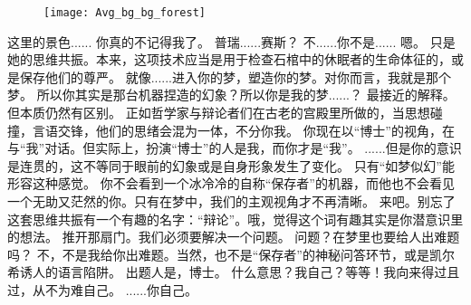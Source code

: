 \documentclass[openany]{book}
\begin{document}
\begin{figure}[h]
    \centering
    \texttt{[image: Avg\_bg\_bg\_forest]}
\end{figure}
\begin{dialogue}
     这里的景色......
     你真的不记得我了。
     普瑞......赛斯？
     不......你不是......
     嗯。
     只是她的思维共振。本来，这项技术应当是用于检查石棺中的休眠者的生命体征的，或是保存他们的尊严。
     就像......进入你的梦，塑造你的梦。对你而言，我就是那个梦。
     所以你其实是那台机器捏造的幻象？所以你是我的梦......？
     最接近的解释。但本质仍然有区别。
     正如哲学家与辩论者们在古老的宫殿里所做的，当思想碰撞，言语交锋，他们的思绪会混为一体，不分你我。
     你现在以“博士”的视角，在与“我”对话。但实际上，扮演“博士”的人是我，而你才是“我”。
     ......但是你的意识是连贯的，这不等同于眼前的幻象或是自身形象发生了变化。
     只有“如梦似幻”能形容这种感觉。
     你不会看到一个冰冷冷的自称“保存者”的机器，而他也不会看见一个无助又茫然的你。只有在梦中，我们的主观视角才不再清晰。
     来吧。别忘了这套思维共振有一个有趣的名字：“辩论”。哦，觉得这个词有趣其实是你潜意识里的想法。
     推开那扇门。我们必须要解决一个问题。
     问题？在梦里也要给人出难题吗？
     不，不是我给你出难题。当然，也不是“保存者”的神秘问答环节，或是凯尔希诱人的语言陷阱。
     出题人是，博士。
     什么意思？我自己？等等！我向来得过且过，从不为难自己。
     ......你自己。
\end{dialogue}
\end{document}
